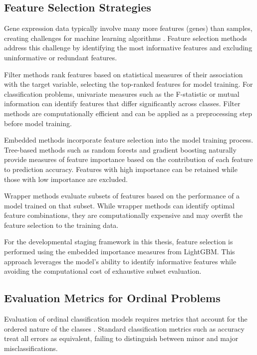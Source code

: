 \subsection{Feature Selection Strategies}

Gene expression data typically involve many more features (genes) than samples, creating challenges for machine learning algorithms \parencite{greener_guide_2022}. Feature selection methods address this challenge by identifying the most informative features and excluding uninformative or redundant features.

Filter methods rank features based on statistical measures of their association with the target variable, selecting the top-ranked features for model training. For classification problems, univariate measures such as the F-statistic or mutual information can identify features that differ significantly across classes. Filter methods are computationally efficient and can be applied as a preprocessing step before model training.

Embedded methods incorporate feature selection into the model training process. Tree-based methods such as random forests and gradient boosting naturally provide measures of feature importance based on the contribution of each feature to prediction accuracy. Features with high importance can be retained while those with low importance are excluded.

Wrapper methods evaluate subsets of features based on the performance of a model trained on that subset. While wrapper methods can identify optimal feature combinations, they are computationally expensive and may overfit the feature selection to the training data.

For the developmental staging framework in this thesis, feature selection is performed using the embedded importance measures from LightGBM. This approach leverages the model's ability to identify informative features while avoiding the computational cost of exhaustive subset evaluation.

\subsection{Evaluation Metrics for Ordinal Problems}

Evaluation of ordinal classification models requires metrics that account for the ordered nature of the classes \parencite{greener_guide_2022}. Standard classification metrics such as accuracy treat all errors as equivalent, failing to distinguish between minor and major misclassifications.

